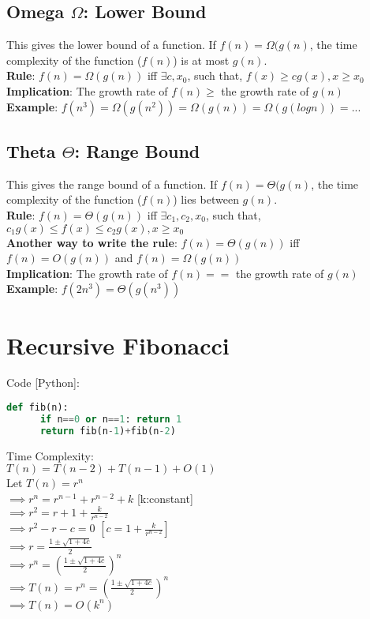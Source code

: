 \documentclass{article}
\begin{document}
\subsection{Omega $\Omega$: Lower Bound}
This gives the lower bound of a function. If $f(n) = \Omega(g(n)$, the time complexity of the function ($f(n)$) is at most $g(n)$.\\
\textbf{Rule}: $f(n) = \Omega(g(n))$ iff $\exists c, x_0$, such that, $f(x) \geq c g(x), x \geq x_0$\\
\textbf{Implication}: The growth rate of $f(n) \geq$ the growth rate of $g(n)$\\
\textbf{Example}: $f(n^3) = \Omega(g(n^2)) = \Omega(g(n)) = \Omega(g(logn)) = ...$

\subsection{Theta $\Theta$: Range Bound}
This gives the range bound of a function. If $f(n) = \Theta(g(n)$, the time complexity of the function ($f(n)$) lies between $g(n)$.\\
\textbf{Rule}: $f(n) = \Theta(g(n))$ iff $\exists c_1,c_2, x_0$, such that, $c_1 g(x) \leq f(x) \leq c_2 g(x), x \geq x_0$\\
\textbf{Another way to write the rule}: $f(n) = \Theta(g(n))$ iff $f(n) = O(g(n))$ and $f(n) = \Omega(g(n))$\\
\textbf{Implication}: The growth rate of $f(n) ==$ the growth rate of $g(n)$\\
\textbf{Example}: $f(2n^3) = \Theta(g(n^3))$


\section{Recursive Fibonacci}
Code [Python]:
\begin{lstlisting}[language=python]
    def fib(n):
      if n==0 or n==1: return 1
      return fib(n-1)+fib(n-2)
\end{lstlisting}
Time Complexity:\\
$T(n) = T(n-2) + T(n-1) + O(1)$\\
Let $T(n) = r^n$\\
$\implies r^n = r^{n-1} + r^{n-2} + k$ [k:constant]\\
$\implies r^2 = r + 1 + \frac{k}{r^{n-2}}$\\
$\implies r^2 - r - c = 0$ $[c = 1 + \frac{k}{r^{n-2}}]$\\
$\implies r = \frac{1 \pm \sqrt{1 + 4c}}{2}$\\
$\implies r^n = (\frac{1 \pm \sqrt{1 + 4c}}{2})^n$\\
$\implies T(n) = r^n = (\frac{1 \pm \sqrt{1 + 4c}}{2})^n$\\
$\implies T(n) = O(k^n)$
\end{document}

